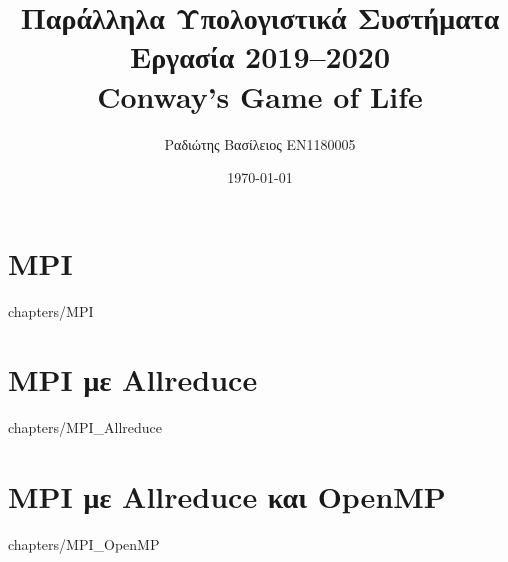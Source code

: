 \documentclass[a4paper,twoside,12pt]{report}
\title {Παράλληλα Υπολογιστικά Συστήματα\\Εργασία 2019--2020\\Conway’s Game of Life}
\author {Ραδιώτης Βασίλειος EN1180005}
\date {\today}
\begin{document}
\maketitle

\tableofcontents{}

\chapter {MPI}
     {chapters/MPI}

\chapter {MPI με Allreduce}
     {chapters/MPI_Allreduce}

\chapter {MPI με Allreduce και OpenMP}
     {chapters/MPI_OpenMP}
\end{document}
